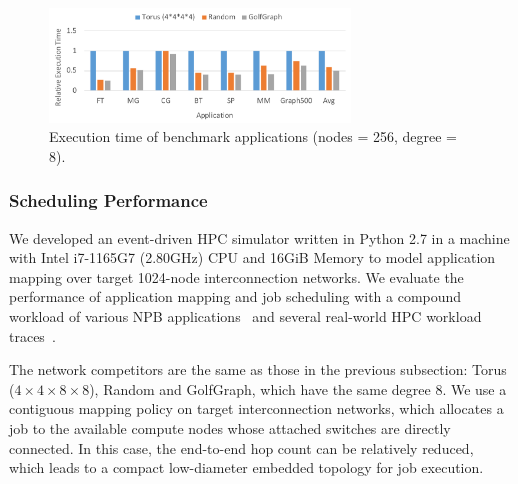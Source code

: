 \documentclass[conference]{IEEEtran}
\begin{document}
\begin{figure}[tb]
	\centering
	\includegraphics[width=8cm]{ps/exec-d8.pdf}
	\caption{Execution time of benchmark applications (nodes = 256, degree = 8).}
	\label{fig:exec-d8}
\end{figure}

\subsubsection{Scheduling Performance}

We developed an event-driven HPC simulator written in Python 2.7 in a machine with Intel i7-1165G7 (2.80GHz) CPU and 16GiB Memory to model application mapping over target 1024-node interconnection networks. 
We evaluate the performance of application mapping and job scheduling with a compound workload of various NPB applications~\cite{NPB} and several real-world HPC workload traces~\cite{wm}.

The network competitors are the same as those in the previous subsection: Torus ($4 \times 4 \times 8 \times 8$), Random and GolfGraph, which have the same degree 8.
We use a contiguous mapping policy on target interconnection networks, which allocates a job to the available compute nodes whose attached switches are directly connected. 
In this case, the end-to-end hop count can be relatively reduced, which leads to a compact low-diameter embedded topology for job execution.
\end{document}
